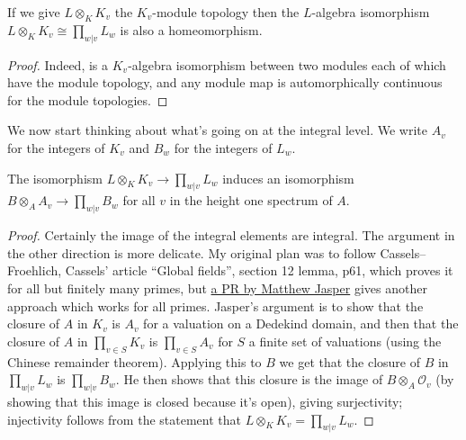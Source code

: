\begin{theorem}
  \label{IsDedekindDomain.HeightOneSpectrum.adicCompletion.baseChangeContinuousAlgEquiv}
  If we give $L\otimes_KK_v$ the $K_v$-module topology then the $L$-algebra isomorphism
  $L\otimes_K K_v\cong\prod_{w|v}L_w$ is also a homeomorphism.
\end{theorem}
\begin{proof} Indeed, is a $K_v$-algebra isomorphism between two modules each of which
  have the module topology, and any module map is automorphically continuous for the
  module topologies.
\end{proof}

We now start thinking about what's going on at the integral level. We write $A_v$
for the integers of $K_v$ and $B_w$ for the integers of $L_w$.

\begin{theorem}
  \label{IsDedekindDomain.HeightOneSpectrum.range_baseChange_comp_tensorAdicCompletionTo_eq_pi}
  \leanok
  The isomorphism $L\otimes_KK_v\to\prod_{w|v}L_w$ induces an isomorphism
  $B\otimes_AA_v\to \prod_{w|v}B_w$
  for all $v$ in the height one spectrum of $A$.
\end{theorem}
\begin{proof}
  \leanok
  Certainly the image of the integral elements are integral. The argument in the other
  direction is more delicate. My original plan was to follow Cassels--Froehlich,
  Cassels' article ``Global fields'', section 12 lemma, p61, which proves it for
  all but finitely many primes, but \href{https://github.com/ImperialCollegeLondon/FLT/pull/400}
  {a PR by Matthew Jasper} gives another approach which works for all primes.
  Jasper's argument is to show that the closure of $A$ in $K_v$ is $A_v$
  for a valuation on a Dedekind domain, and then that the closure of $A$ in $\prod_{v\in S}K_v$
  is $\prod_{v\in S}A_v$ for $S$ a finite set of valuations (using the Chinese
  remainder theorem). Applying this to $B$ we get that the closure of $B$ in $\prod_{w|v}L_w$
  is $\prod_{w|v}B_w$. He then shows that this closure is the image of
  $B\otimes_A\mathcal{O}_v$ (by showing that this image is closed because it's open),
  giving surjectivity; injectivity follows from the statement
  that $L\otimes_KK_v=\prod_{w|v}L_w$.
\end{proof}

